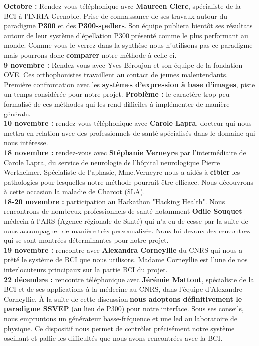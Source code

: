 \documentclass[11pt,a4paper]{article}
\theoremstyle{plain}
\theoremstyle{definition}
\begin{document}
\textbf{Octobre : } Rendez vous téléphonique avec \textbf{Maureen Clerc}, spécialiste de la BCI à l'INRIA Grenoble. Prise de connaissance de ses travaux autour du paradigme \textbf{P300} et des \textbf{P300-spellers}. Son équipe publiera bientôt ses résultats autour de leur système d'épellation P300 présenté comme le plus performant au monde. Comme vous le verrez dans la synthèse nous n'utilisons pas ce paradigme mais pourrons donc \textbf{comparer} notre méthode à celle-ci.\\

\textbf{9 novembre : } Rendez vous avec Yves Béroujon et son équipe de la fondation OVE. Ces orthophonistes travaillent au contact de jeunes malentendants. Première confrontation avec les \textbf{systèmes d'expression à base d'images}, piste un temps considérée pour notre projet.  \textbf{Problème :} le caractère trop peu formalisé de ces méthodes qui les rend difficiles à implémenter de manière générale. \\

\textbf{10 novembre : } rendez-vous téléphonique avec \textbf{Carole Lapra}, docteur qui nous mettra en relation avec des professionnels de santé spécialisés dans le domaine qui nous intéresse. \\

\textbf{18 novembre : } rendez-vous avec \textbf{Stéphanie Verneyre} par l'intermédiaire de Carole Lapra, du service de neurologie de l'hôpital neurologique Pierre Wertheimer. Spécialiste de l'aphasie, Mme.Verneyre nous a aidés à \textbf{cibler} les pathologies pour lesquelles notre méthode pourrait être efficace. Nous découvrons à cette occasion la maladie de Charcot (SLA). \\

\textbf{18-20 novembre : } participation au Hackathon "Hacking Health". Nous rencontrons de nombreux professionnels de santé notamment \textbf{Odile Souquet} médecin à l'ARS (Agence régionale de Santé) qui n'a eu de cesse par la suite de nous accompagner de manière très personnalisée. Nous lui devons des rencontres qui se sont montrées déterminantes pour notre projet. \\

\textbf{19 novembre : } rencontre avec \textbf{Alexandra Corneyllie} du CNRS qui nous a prêté le système de BCI que nous utilisons. Madame Corneyllie est l'une de nos interlocuteurs principaux sur la partie BCI du projet. \\

\textbf{22 décembre : } rencontre téléphonique avec \textbf{Jérémie Mattout}, spécialiste de la BCI et de ses applications à la médecine au CNRS, dans l'équipe d'Alexandre Corneyllie. À la suite de cette discussion \textbf{nous adoptons définitivement le paradigme SSVEP} (au lieu de P300) pour notre interface. Sous ses conseils, nous empruntons un générateur basse-fréquence et une led au laboratoire de physique. Ce dispositif nous permet de contrôler précisément notre système oscillant et pallie les difficultés que nous avons rencontrées avec la BCI. \\
\end{document}
